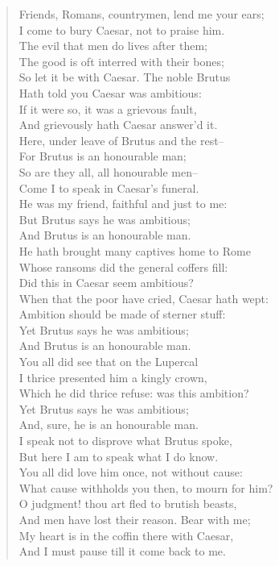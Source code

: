 \documentclass[10pt]{memoir}
\begin{document}
\begin{verse}
Friends, Romans, countrymen, lend me your ears;\\
I come to bury Caesar, not to praise him.\\
The evil that men do lives after them;\\
The good is oft interred with their bones;\\
So let it be with Caesar. The noble Brutus\\
Hath told you Caesar was ambitious:\\
If it were so, it was a grievous fault,\\
And grievously hath Caesar answer'd it.\\
Here, under leave of Brutus and the rest--\\
For Brutus is an honourable man;\\
So are they all, all honourable men--\\
Come I to speak in Caesar's funeral.\\
He was my friend, faithful and just to me:\\
But Brutus says he was ambitious;\\
And Brutus is an honourable man.\\
He hath brought many captives home to Rome\\
Whose ransoms did the general coffers fill:\\
Did this in Caesar seem ambitious?\\
When that the poor have cried, Caesar hath wept:\\
Ambition should be made of sterner stuff:\\
Yet Brutus says he was ambitious;\\
And Brutus is an honourable man.\\
You all did see that on the Lupercal\\
I thrice presented him a kingly crown,\\
Which he did thrice refuse: was this ambition?\\
Yet Brutus says he was ambitious;\\
And, sure, he is an honourable man.\\
I speak not to disprove what Brutus spoke,\\
But here I am to speak what I do know.\\
You all did love him once, not without cause:\\
What cause withholds you then, to mourn for him?\\
O judgment! thou art fled to brutish beasts,\\
And men have lost their reason. Bear with me;\\
My heart is in the coffin there with Caesar,\\
And I must pause till it come back to me.
\end{verse}
\end{document}
